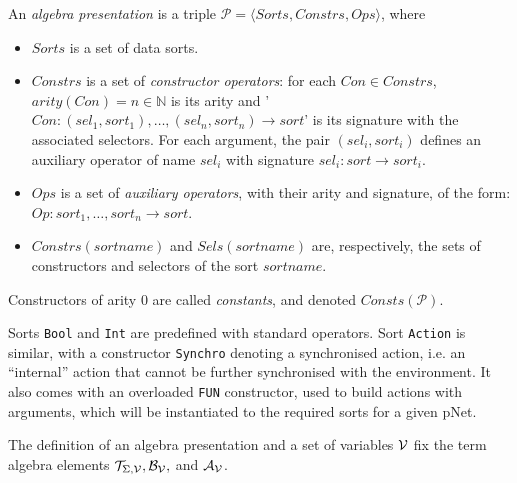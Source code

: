 \documentclass[smallcondensed]{svjour3}
\newcommand{\noteSB}[2][color=green!40, size=\tiny]{\todo[#1]{{\bf
      Note: } {#2}}}
\newcommand{\cT}{\ensuremath{\mathcal{T}}}
\newcommand{\cV}{\ensuremath{\mathcal{V}}}
\newcommand{\signature}{\ensuremath{\Sigma}}
\newcommand{\variables}{\ensuremath{\cV}}
\newcommand{\Talg}{\ensuremath{\cT_{\signature,\variables}}}
\def\AlgA{\mathcal{A}}
\def\AlgB{\mathcal{B}}
\newcommand{\mdash}{---}
\begin{document}
\def\APres{\mathcal{P}}
\begin{definition}
	An \emph{algebra presentation} is a triple $\APres=\langle\mathit{Sorts},\mathit{Constrs},\mathit{Ops}\rangle$, where
	
	\begin{itemize}
		\item $Sorts$ is a set of data sorts.
		\item $\mathit{Constrs}$ is a set of \emph{constructor operators}: for each $\mathit{Con} \in \mathit{Constrs}$, $arity(Con)=n \in \mathbb{N}$ is its arity 
		and '$Con : (\mathit{sel}_1,\mathit{sort}_1), \dots, (\mathit{sel}_n,\mathit{sort}_n) \rightarrow \mathit{sort}$' is its signature with the associated selectors.
		For each argument, the pair $(\mathit{sel}_i,\mathit{sort}_i)$ defines an auxiliary
		operator of name $\mathit{sel}_i$ with signature $\mathit{sel}_i : \mathit{sort} \rightarrow \mathit{sort}_i$.
		\item $Ops$ is a set of \emph{auxiliary operators}, with their
		arity and signature, of the form: $Op : \mathit{sort}_1, \dots,  \mathit{sort}_n \rightarrow
		\mathit{sort}$.
		\item $\mathit{Constrs}(\mathit{sortname})$ and $\mathit{Sels}(\mathit{sortname})$ are, respectively, the sets of
		constructors and selectors of the sort $\mathit{sortname}$.
	\end{itemize}
	Constructors of arity 0 are called \emph{constants}, and denoted $\mathit{Consts}(\APres)$.
\end{definition}


Sorts \texttt{Bool} and \texttt{Int} are predefined with standard operators.
Sort \texttt{Action} is similar, with a constructor \texttt{Synchro} denoting
a synchronised action, i.e. an ``internal'' action that cannot be
further synchronised with the environment. It also comes with an
overloaded \texttt{FUN} constructor, used to build actions with
arguments, which will be instantiated to the required sorts for a given
pNet.

The definition of an algebra presentation and a set of variables
$\P$ fix the term algebra elements $\Talg, \AlgB_{\P},$ and $\AlgA_\P$.
\end{document}
